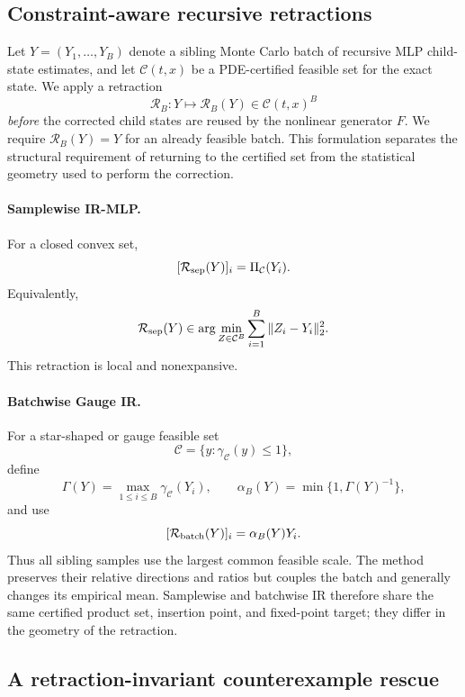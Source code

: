 
\subsection{Constraint-aware recursive retractions}
\label{sec:constraint-retractions}

Let $Y=(Y_1,\ldots,Y_B)$ denote a sibling Monte Carlo batch of recursive
MLP child-state estimates, and let $\mathcal C(t,x)$ be a PDE-certified
feasible set for the exact state. We apply a retraction
\[
  \mathcal R_B:Y\longmapsto \mathcal R_B(Y)\in\mathcal C(t,x)^B
\]
\emph{before} the corrected child states are reused by the nonlinear
generator $F$. We require $\mathcal R_B(Y)=Y$ for an already feasible
batch. This formulation separates the structural requirement of returning to
the certified set from the statistical geometry used to perform the
correction.

\paragraph{Samplewise IR-MLP.}
For a closed convex set,
\[
 [\mathcal R_{\rm sep}(Y)]_i=\Pi_{\mathcal C}(Y_i).
\]
Equivalently,
\[
 \mathcal R_{\rm sep}(Y)
 \in\arg\min_{Z\in\mathcal C^B}\sum_{i=1}^B\|Z_i-Y_i\|_2^2.
\]
This retraction is local and nonexpansive.

\paragraph{Batchwise Gauge IR.}
For a star-shaped or gauge feasible set
\[
 \mathcal C=\{y:\gamma_{\mathcal C}(y)\le1\},
\]
define
\[
 \Gamma(Y)=\max_{1\le i\le B}\gamma_{\mathcal C}(Y_i),
 \qquad
 \alpha_B(Y)=\min\{1,\Gamma(Y)^{-1}\},
\]
and use
\[
 [\mathcal R_{\rm batch}(Y)]_i=\alpha_B(Y)Y_i.
\]
Thus all sibling samples use the largest common feasible scale. The method
preserves their relative directions and ratios but couples the batch and
generally changes its empirical mean. Samplewise and batchwise IR therefore
share the same certified product set, insertion point, and fixed-point target;
they differ in the geometry of the retraction.

\subsection{A retraction-invariant counterexample rescue}
\label{sec:retraction-rescue}

